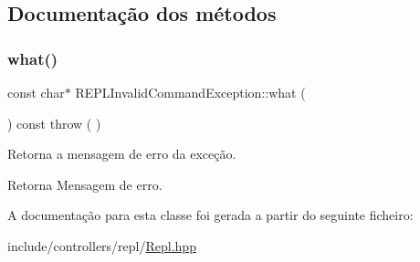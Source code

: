 \subsection{Documentação dos métodos}
\mbox{\label{classREPLInvalidCommandException_aec4c314ef19ce522dedb49c7451bafc0}} 
\subsubsection{\texorpdfstring{what()}{what()}}
{\footnotesize\ttfamily const char$\ast$ R\+E\+P\+L\+Invalid\+Command\+Exception\+::what (\begin{DoxyParamCaption}{ }\end{DoxyParamCaption}) const throw ( ) \hspace{0.3cm}{\ttfamily [inline]}}

Retorna a mensagem de erro da exceção. \begin{DoxyReturn}{Retorna}
Mensagem de erro. 
\end{DoxyReturn}


A documentação para esta classe foi gerada a partir do seguinte ficheiro\+:\begin{DoxyCompactItemize}
\item 
include/controllers/repl/\mbox{\hyperlink{Repl_8hpp}{Repl.\+hpp}}\end{DoxyCompactItemize}
